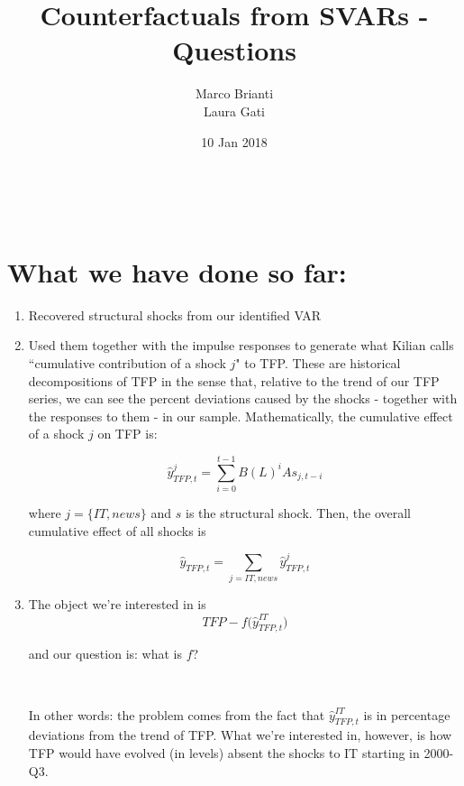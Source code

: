\documentclass{article}
\title{Counterfactuals from SVARs - Questions}
\author{Marco Brianti\\Laura Gati}
\date{10 Jan 2018}
\begin{document}
\maketitle

\

\section{What we have done so far:}
\begin{enumerate}
\item Recovered structural shocks from our identified VAR
\item Used them together with the impulse responses to generate what Kilian calls ``cumulative contribution of a shock $j$" to TFP. These are historical decompositions of TFP in the sense that, relative to the trend of our TFP series, we can see the percent deviations caused by the shocks - together with the responses to them - in our sample. Mathematically, the cumulative effect of a shock $j$ on TFP is:

\begin{equation}
\hat{y}^{j}_{TFP, t} = \sum^{t-1}_{i=0} B(L)^i A s_{j, t-i}
\end{equation}

where $j = \{IT, news\}$ and $s$ is the structural shock. Then, the overall cumulative effect of all shocks is

\begin{equation}
\hat{y}_{TFP, t} = \sum_{j= IT,news} \hat{y}^{j}_{TFP, t}
\end{equation}

\item The object we're interested in is
\begin{equation}
TFP - f\big( \hat{y}^{IT}_{TFP, t} \big)
\end{equation}

and our question is: what is $f$?

\

In other words: the problem comes from the fact that $\hat{y}^{IT}_{TFP, t}$ is in percentage deviations from the trend of TFP. What we're interested in, however, is how TFP would have evolved (in levels) absent the shocks to IT starting in 2000-Q3. 


\end{enumerate}
\end{document}
